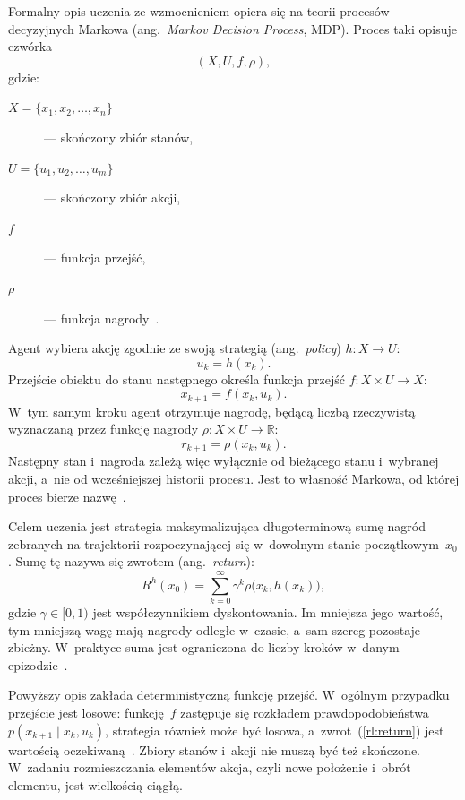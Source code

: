 Formalny opis uczenia ze wzmocnieniem opiera się na teorii procesów
decyzyjnych Markowa (ang.~\emph{Markov Decision Process}, MDP). Proces
taki opisuje czwórka
\begin{equation}
  (X, U, f, \rho),
  \label{eq:mdp}
\end{equation}
gdzie:
\begin{description}
  \item[$X = \{x_1, x_2, \ldots, x_n\}$] --- skończony zbiór stanów,
  \item[$U = \{u_1, u_2, \ldots, u_m\}$] --- skończony zbiór akcji,
  \item[$f$] --- funkcja przejść,
  \item[$\rho$] --- funkcja nagrody~\cite{Rak2013RL}.
\end{description}

Agent wybiera akcję zgodnie ze swoją strategią (ang.~\emph{policy})
$h \colon X \to U$:
\begin{equation}
  u_k = h(x_k).
  \label{rl:action}
\end{equation}
Przejście obiektu do stanu następnego określa funkcja przejść
$f \colon X \times U \to X$:
\begin{equation}
  x_{k+1} = f(x_k, u_k).
  \label{rl:nextstep}
\end{equation}
W~tym samym kroku agent otrzymuje nagrodę, będącą liczbą rzeczywistą
wyznaczaną przez funkcję nagrody $\rho \colon X \times U \to \mathbb{R}$:
\begin{equation}
  r_{k+1} = \rho(x_k, u_k).
  \label{rl:reward}
\end{equation}
Następny stan i~nagroda zależą więc wyłącznie od bieżącego stanu
i~wybranej akcji, a~nie od wcześniejszej historii procesu. Jest to
własność Markowa, od której proces bierze nazwę~\cite{Rak2013RL}.

Celem uczenia jest strategia maksymalizująca długoterminową sumę nagród
zebranych na trajektorii rozpoczynającej się w~dowolnym stanie
początkowym~$x_0$. Sumę tę nazywa się zwrotem (ang.~\emph{return}):
\begin{equation}
  R^h(x_0) = \sum_{k=0}^{\infty} \gamma^k \rho\bigl(x_k, h(x_k)\bigr),
  \label{rl:return}
\end{equation}
gdzie $\gamma \in [0, 1)$ jest współczynnikiem dyskontowania. Im mniejsza
jego wartość, tym mniejszą wagę mają nagrody odległe w~czasie, a~sam
szereg pozostaje zbieżny. W~praktyce suma jest ograniczona do liczby
kroków w~danym epizodzie~\cite{Rak2013RL}.

Powyższy opis zakłada deterministyczną funkcję przejść. W~ogólnym
przypadku przejście jest losowe: funkcję~$f$ zastępuje się rozkładem
prawdopodobieństwa $p(x_{k+1} \mid x_k, u_k)$, strategia również może
być losowa, a~zwrot~(\ref{rl:return}) jest wartością
oczekiwaną~\cite{Sutton2018RL}. Zbiory stanów i~akcji nie muszą być
też skończone. W~zadaniu rozmieszczania elementów akcja, czyli nowe
położenie i~obrót elementu, jest wielkością ciągłą.

